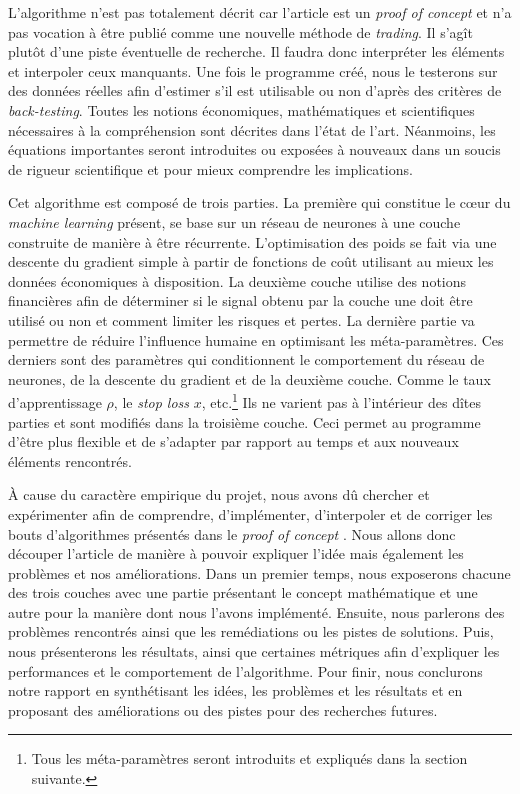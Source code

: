\documentclass[a4paper, 11pt]{article}
\begin{document}
L'algorithme n'est pas totalement décrit car l'article
est un \textit{proof of concept} et n'a pas vocation à être publié comme une nouvelle méthode de \textit{trading}. Il s'agît plutôt d'une piste 
éventuelle de recherche. Il faudra donc
interpréter les éléments et interpoler ceux manquants. Une fois le programme créé, nous le testerons sur des données réelles afin d'estimer s'il est
utilisable ou non d'après des critères de \textit{back-testing}. Toutes les notions économiques, mathématiques et scientifiques nécessaires à la 
compréhension sont décrites dans l'état de l'art. Néanmoins, les équations importantes seront introduites ou exposées à nouveaux
dans un soucis de rigueur scientifique et pour mieux comprendre les implications.

Cet algorithme est composé de trois parties. La première qui constitue le cœur du \textit{machine learning} présent, se base sur un réseau de neurones
à une couche construite de manière à être récurrente. L'optimisation des poids se fait via une descente du gradient simple 
à partir de fonctions de coût utilisant au mieux les données économiques à disposition. La deuxième couche utilise des notions financières afin de
déterminer si le signal obtenu par la couche une doit être utilisé ou non et comment limiter les risques et pertes. La dernière partie va permettre de
réduire l'influence humaine en optimisant les méta-paramètres. Ces derniers sont des paramètres qui conditionnent le comportement du réseau de neurones,
de la descente du gradient et de la deuxième couche. Comme le taux d'apprentissage $\rho$, le \textit{stop loss} $x$, etc.\footnote{Tous les méta-paramètres
seront introduits et expliqués dans la section suivante.} Ils ne varient pas 
à l'intérieur des dîtes parties et sont modifiés dans la troisième couche. Ceci permet au programme d'être plus flexible et de s'adapter par
rapport au temps et aux nouveaux éléments rencontrés.

À cause du caractère empirique du projet, nous avons dû chercher et expérimenter afin de comprendre, d'implémenter, d'interpoler et de corriger
les bouts d'algorithmes présentés dans le \textit{proof of concept} \cite{fx_trading}. Nous allons donc découper l'article de manière à pouvoir 
expliquer l'idée mais également les problèmes et nos améliorations.
Dans un premier temps, nous exposerons chacune des trois couches avec une partie présentant le concept mathématique et une autre pour la manière dont nous
l'avons implémenté. Ensuite, nous parlerons des problèmes rencontrés ainsi que les remédiations ou les pistes de solutions.
Puis, nous présenterons les résultats, ainsi que certaines métriques afin d'expliquer les performances et le comportement de l'algorithme. Pour
finir, nous conclurons notre rapport en synthétisant les idées, les problèmes et les résultats et en proposant des améliorations ou des pistes pour 
des recherches futures.
\end{document}
